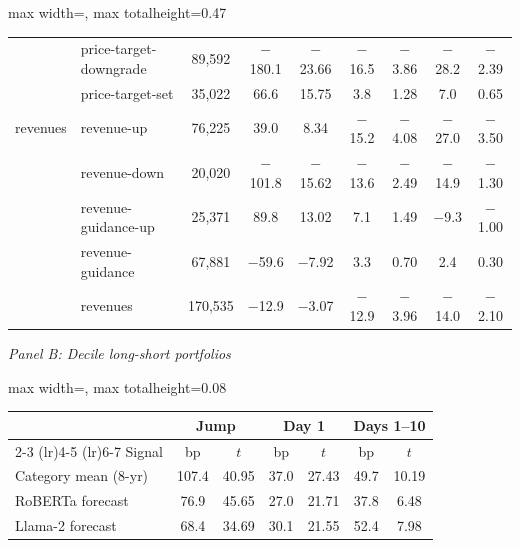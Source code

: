 \begin{table}[htbp]
{\begin{adjustbox}{max width=\linewidth, max totalheight=0.47\textheight}
\begin{tabular}{llccccccc}
 & price-target-downgrade & \phantom{0}89,592 & $-$180.1 & $-$23.66 & $-$16.5 & \phantom{0}$-$3.86 & $-$28.2 & $-$2.39 \\
 & price-target-set & \phantom{0}35,022 & \phantom{$-$0}66.6 & \phantom{$-$}15.75 & \phantom{$-$0}3.8 & \phantom{$-$0}1.28 & \phantom{$-$0}7.0 & \phantom{$-$}0.65 \\
\midrule
revenues & revenue-up & \phantom{0}76,225 & \phantom{$-$0}39.0 & \phantom{$-$0}8.34 & $-$15.2 & \phantom{0}$-$4.08 & $-$27.0 & $-$3.50 \\
 & revenue-down & \phantom{0}20,020 & $-$101.8 & $-$15.62 & $-$13.6 & \phantom{0}$-$2.49 & $-$14.9 & $-$1.30 \\
 & revenue-guidance-up & \phantom{0}25,371 & \phantom{$-$0}89.8 & \phantom{$-$}13.02 & \phantom{$-$0}7.1 & \phantom{$-$0}1.49 & \phantom{0}$-$9.3 & $-$1.00 \\
 & revenue-guidance & \phantom{0}67,881 & \phantom{0}$-$59.6 & \phantom{0}$-$7.92 & \phantom{$-$0}3.3 & \phantom{$-$0}0.70 & \phantom{$-$0}2.4 & \phantom{$-$}0.30 \\
 & revenues & 170,535 & \phantom{0}$-$12.9 & \phantom{0}$-$3.07 & $-$12.9 & \phantom{0}$-$3.96 & $-$14.0 & $-$2.10 \\
\bottomrule
\end{tabular}
\end{adjustbox}
\par\medskip
\textit{Panel B: Decile long-short portfolios}\\[2pt]
\begin{adjustbox}{max width=\linewidth, max totalheight=0.08\textheight}
\begin{tabular}{lcccccc}
\toprule
 & \multicolumn{2}{c}{Jump} & \multicolumn{2}{c}{Day 1} & \multicolumn{2}{c}{Days 1--10} \\
\cmidrule(lr){2-3} \cmidrule(lr){4-5} \cmidrule(lr){6-7}
Signal & bp & $t$ & bp & $t$ & bp & $t$ \\
\midrule
Category mean (8-yr) & 107.4 & 40.95 & 37.0 & 27.43 & 49.7 & 10.19 \\
RoBERTa forecast & \phantom{0}76.9 & 45.65 & 27.0 & 21.71 & 37.8 & \phantom{0}6.48 \\
Llama-2 forecast & \phantom{0}68.4 & 34.69 & 30.1 & 21.55 & 52.4 & \phantom{0}7.98 \\
\bottomrule
\end{tabular}
\end{adjustbox}
}
\end{table}
